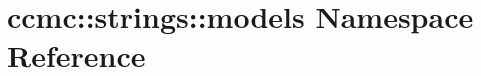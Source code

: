 \hypertarget{namespaceccmc_1_1strings_1_1models}{\section{ccmc\-:\-:strings\-:\-:models Namespace Reference}
\label{namespaceccmc_1_1strings_1_1models}
}
